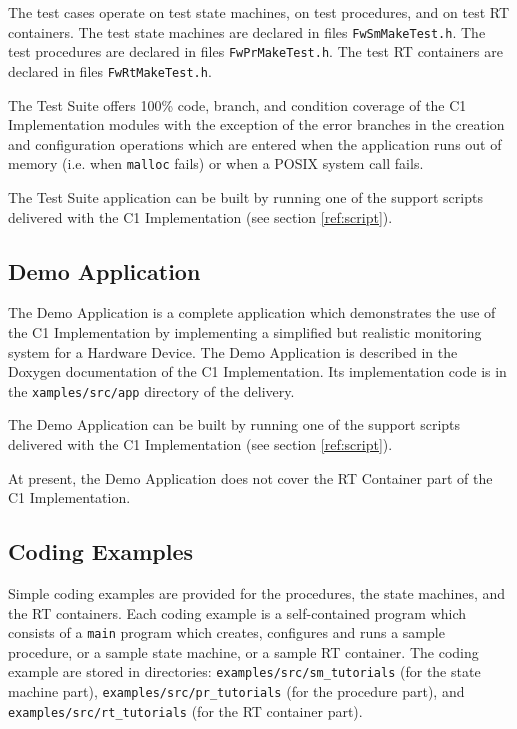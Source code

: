 \documentclass[a4paper,10pt]{article}
\begin{document}
The test cases operate on test state machines, on test procedures, and on test RT containers. 
The test state machines are declared in files \texttt{FwSmMakeTest.h}. 
The test procedures are declared in files \texttt{FwPrMakeTest.h}.
The test RT containers are declared in files \texttt{FwRtMakeTest.h}.

The Test Suite offers 100\% code, branch, and condition coverage of the C1 Implementation modules with the exception of the error branches in the creation and configuration operations which are entered when the application runs out of memory (i.e. when \texttt{malloc} fails) or when a POSIX system call fails.

The Test Suite application can be built by running one of the support scripts delivered with the C1 Implementation (see section \ref{ref:script}). 

\subsection{Demo Application}\label{sec:demoApp}
The Demo Application is a complete application which demonstrates the use of the C1 Implementation by implementing a simplified but realistic monitoring system for a Hardware Device. The Demo Application is described in the Doxygen documentation of the C1 Implementation. Its implementation code is in the \texttt{xamples/src/app} directory of the delivery.

The Demo Application can be built by running one of the support scripts delivered with the C1 Implementation (see section \ref{ref:script}). 

At present, the Demo Application does not cover the RT Container part of the C1 Implementation.

\subsection{Coding Examples}\label{sec:codingExamples}
Simple coding examples are provided for the procedures, the state machines, and the RT containers. Each coding example is a self-contained program which consists of a \texttt{main} program which creates, configures and runs a sample procedure, or a sample state machine, or a sample RT container. The coding example are stored in directories: \texttt{examples/src/sm\_tutorials} (for the state machine part), \texttt{examples/src/pr\_tutorials} (for the procedure part), and \texttt{examples/src/rt\_tutorials} (for the RT container part).
\end{document}

